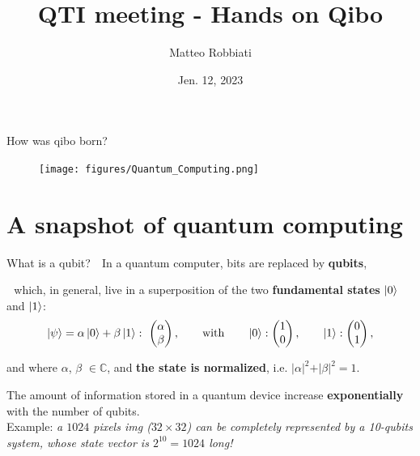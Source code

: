 \documentclass[8pt, xcolor={svgnames}, hyperref={colorlinks,linkcolor=black, citecolor=amethyst, urlcolor=amethyst}]{beamer}
\title{QTI meeting - Hands on Qibo}
\date{Jen. 12, 2023}
\author[Matteo Robbiati]{Matteo Robbiati}
\begin{document}
\maketitle

\begin{frame}{How was qibo born?}
    \begin{figure}  
    \texttt{[image: figures/Quantum\_Computing.png]}
    \end{figure}
    \vspace{-0.5cm}
\end{frame}

\section{A snapshot of quantum computing}

\begin{frame}{What is a qubit?}
\large
\faArrowCircleRight\,\, In a quantum computer, bits are replaced by \textbf{qubits},
\pause

\faArrowCircleRight\,\, which, in general, live in a superposition of 
the two \textbf{fundamental states} $\ket{0}$ and $\ket{1}$:
\begin{equation*}
    \ket{\psi} = \alpha \ket{0} + \beta \ket{1}: \,\,
    \begin{pmatrix} 
    \alpha \\ 
    \beta 
    \end{pmatrix}, \qquad \text{with} \qquad     
    \ket{0}:
    \begin{pmatrix} 
    1 \\ 
    0  
    \end{pmatrix}, \qquad \ket{1}:
    \begin{pmatrix} 
    0 \\ 
    1 
    \end{pmatrix}, 
\end{equation*}

and where $\alpha$, $\beta$ $\in \mathbb{C}$, and \textbf{the state is normalized}, i.e. $
    \vert \alpha \vert^2 + \vert \beta \vert^2 = 1.
$   
\pause
\vspace{0.8cm}
\begin{tcolorbox}[colback=amethyst!30, title=Storage advantage]
  The amount of information stored in a quantum device increase \textbf{exponentially}
  with the number of qubits. \\
  
  Example: \textit{a $1024$ pixels img ($32 \times 32$) can be completely represented 
  by a 10-qubits system, whose state vector is $2^{10}=1024$ long!}
\end{tcolorbox}
\end{frame}
\end{document}
